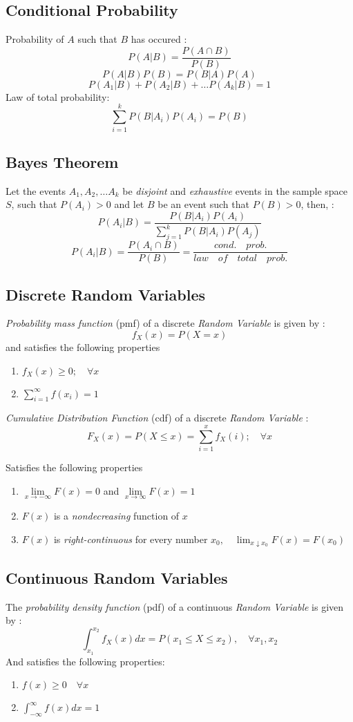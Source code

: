 \documentclass[12pt]{article}
\begin{document}
\subsection*{Conditional Probability}
Probability of $A$ such that $B$ has occured \cite[p.12]{classnotes.2}:
$$P(A|B)=\frac{P(A \cap B)}{P(B)}$$ 
$$P(A|B)P(B)=P(B|A)P(A)$$
$$P(A_1|B)+P(A_2|B)+\dots P(A_k|B)=1$$
Law of total probability:
$$\sum\limits_{i=1}^k P(B|A_i)P(A_i)=P(B)$$

\subsection*{Bayes Theorem}
Let the events $A_1,A_2,\dots A_k$ be \emph{disjoint} and \emph{exhaustive} events in the sample space $S$, such that $P(A_i)>0$ and let $B$ be an event such that $P(B)>0$, then, \cite[p.7]{classnotes.3}:
$$P(A_i|B)=\frac{P(B|A_i)P(A_i)}{\sum_{j=1}^k P(B|A_i)P(A_j)}$$
$$P(A_i|B)=\frac{P(A_i \cap B)}{P(B)} = \frac{cond. \quad prob.}{law \quad of \quad total \quad prob.}$$

\subsection*{Discrete Random Variables}
\emph{Probability mass function} (pmf) of a discrete \emph{Random Variable} is given by \cite[p.11]{classnotes.3}:
$$f_X(x)=P(X=x)$$
and satisfies the following properties
\begin{enumerate}
\item $f_X(x)\geq 0; \quad \forall x$
\item $\sum\limits_{i=1}^{\infty}f(x_i)=1$
\end{enumerate}

\emph{Cumulative Distribution Function} (cdf) of a discrete \emph{Random Variable} \cite[p.13]{classnotes.3}:
$$F_X(x)=P(X\leq x)=\sum\limits_{i=1}^{x}f_X(i); \quad \forall x$$

Satisfies the following properties
\begin{enumerate}
\item $\lim\limits_{x\to-\infty}F(x)=0$ and $\lim\limits_{x\to\infty}F(x)=1$
\item $F(x)$ is a \emph{nondecreasing} function of $x$
\item $F(x)$ is \emph{right-continuous} for every number $x_0, \quad \lim_{x\downarrow x_0}F(x)=F(x_0)$
\end{enumerate}

\subsection*{Continuous Random Variables}
The \emph{probability density function} (pdf) of a continuous \emph{Random Variable} is given by \cite[p.4]{classnotes.4}:
$$\int_{x_1}^{x_2}f_X(x)dx=P(x_1\leq X\leq x_2), \quad \forall x_1,x_2$$
And satisfies the following properties:
\begin{enumerate}
\item $f(x)\geq 0 \quad \forall x$
\item $\int_{-\infty}^{\infty}f(x)dx=1$
\end{enumerate}
\end{document}
